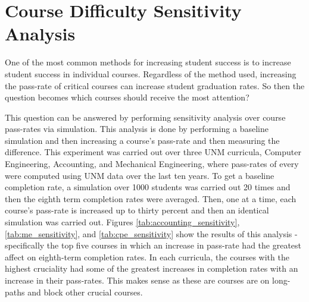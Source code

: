 \documentclass[botnum, fleqn]{unmeethesis}
\begin{document}
    \section{Course Difficulty Sensitivity Analysis}
      One of the most common methods for increasing student success is to increase student success in individual courses. Regardless of the method used, increasing the pass-rate of critical courses can increase student graduation rates. So then the question becomes which courses should receive the most attention?

      This question can be answered by performing sensitivity analysis over course pass-rates via simulation. This analysis is done by performing a baseline simulation and then increasing a course's pass-rate and then measuring the difference. This experiment was carried out over three UNM curricula, Computer Engineering, Accounting, and Mechanical Engineering, where pass-rates of every were computed using UNM data over the last ten years. To get a baseline completion rate, a simulation over 1000 students was carried out 20 times and then the eighth term completion rates were averaged. Then, one at a time, each course's pass-rate is increased up to thirty percent and then an identical simulation was carried out. Figures \ref{tab:accounting_sensitivity}, \ref{tab:me_sensitivity}, and \ref{tab:cpe_sensitivity} show the results of this analysis - specifically the top five courses in which an increase in pass-rate had the greatest affect on eighth-term completion rates. In each curricula, the courses with the highest cruciality had some of the greatest increases in completion rates with an increase in their pass-rates. This makes sense as these are courses are on long-paths and block other crucial courses.

\end{document}
